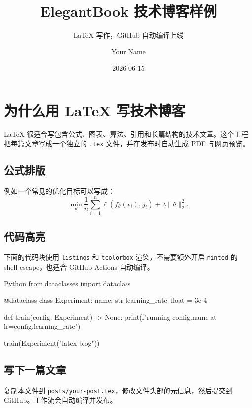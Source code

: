 \documentclass[cn,nofont,11pt]{elegantbook}
\title{ElegantBook 技术博客样例}
\subtitle{LaTeX 写作，GitHub 自动编译上线}
\author{Your Name}
\institute{Tech Notes}
\date{2026-06-15}
\begin{document}
\maketitle
\frontmatter
\tableofcontents
\mainmatter

\chapter{为什么用 LaTeX 写技术博客}

LaTeX 很适合写包含公式、图表、算法、引用和长篇结构的技术文章。这个工程把每篇文章写成一个独立的 \verb|.tex| 文件，并在发布时自动生成 PDF 与网页预览。

\section{公式排版}

例如一个常见的优化目标可以写成：
\[
  \min_{\theta} \frac{1}{n}\sum_{i=1}^{n}\ell(f_{\theta}(x_i), y_i) + \lambda\|\theta\|_2^2.
\]

\section{代码高亮}

下面的代码块使用 \verb|listings| 和 \verb|tcolorbox| 渲染，不需要额外开启 \verb|minted| 的 shell escape，也适合 GitHub Actions 自动编译。

\begin{codeblock}{Python}
from dataclasses import dataclass

@dataclass
class Experiment:
    name: str
    learning_rate: float = 3e-4

def train(config: Experiment) -> None:
    print(f"running {config.name} at lr={config.learning_rate}")

train(Experiment("latex-blog"))
\end{codeblock}

\section{写下一篇文章}

复制本文件到 \verb|posts/your-post.tex|，修改文件头部的元信息，然后提交到 GitHub。工作流会自动编译并发布。
\end{document}
